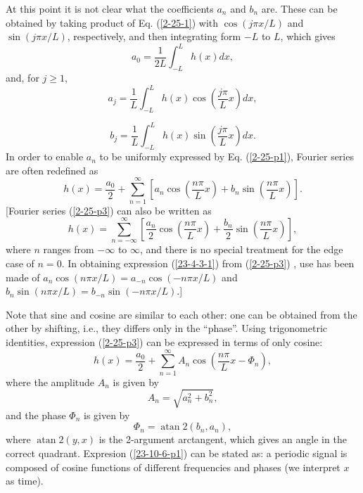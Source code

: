\documentclass{article}
\newcommand{\tmop}[1]{\ensuremath{\operatorname{#1}}}
\begin{document}
At this point it is not clear what the coefficients $a_n$ and $b_n$ are. These
can be obtained by taking product of Eq. (\ref{2-25-1}) with $\cos (j \pi x /
L)$ and $\sin (j \pi x / L)$, respectively, and then integrating form $- L$ to
$L$, which gives
\begin{equation}
  a_0 = \frac{1}{2 L} \int_{- L}^L h (x) d x,
\end{equation}
and, for $j \geqslant 1$,
\begin{equation}
  \label{2-25-p1} a_j = \frac{1}{L} \int_{- L}^L h (x) \cos \left( \frac{j
  \pi}{L} x \right) d x,
\end{equation}

\begin{equation}
  \label{2-25-p1m} b_j = \frac{1}{L} \int_{- L}^L h (x) \sin \left( \frac{j
  \pi}{L} x \right) d x.
\end{equation}
In order to enable $a_n$ to be uniformly expressed by Eq. (\ref{2-25-p1}),
Fourier series are often redefined as
\begin{equation}
  \label{2-25-p3} h (x) = \frac{a_0}{2} + \sum_{n = 1}^{\infty} \left[ a_n
  \cos \left( \frac{n \pi}{L} x \right) + b_n \sin \left( \frac{n \pi}{L} x
  \right) \right] .
\end{equation}
[Fourier series (\ref{2-25-p3}) can also be written as
\begin{equation}
  \label{23-4-3-1} h (x) = \sum_{n = - \infty}^{\infty} \left[ \frac{a_n}{2}
  \cos \left( \frac{n \pi}{L} x \right) + \frac{b_n}{2} \sin \left( \frac{n
  \pi}{L} x \right) \right],
\end{equation}
where $n$ ranges from $- \infty$ to $\infty$, and there is no special
treatment for the edge case of $n = 0$. In obtaining expression
(\ref{23-4-3-1}) from (\ref{2-25-p3}) , use has been made of $a_n \cos (n \pi
x / L) = a_{- n} \cos (- n \pi x / L)$ and $b_n \sin (n \pi x / L) = b_{- n}
\sin (- n \pi x / L)$.]

Note that sine and cosine are similar to each other: one can be obtained from
the other by shifting, i.e., they differs only in the ``phase''. Using
trigonometric identities, expression (\ref{2-25-p3}) can be expressed in terms
of only cosine:
\begin{equation}
  \label{23-10-6-p1} h (x) = \frac{a_0}{2} + \sum_{n = 1}^{\infty} A_n \cos
  \left( \frac{n \pi}{L} x - \Phi_n \right),
\end{equation}
where the amplitude $A_n$ is given by
\begin{equation}
  \label{20-12-16-a1} A_n = \sqrt{a_n^2 + b_n^2},
\end{equation}
and the phase $\Phi_n$ is given by
\begin{equation}
  \label{20-12-19-a1} \Phi_n = \tmop{atan} 2 (b_n, a_n),
\end{equation}
where $\tmop{atan} 2 (y, x)$ is the 2-argument arctangent, which gives an
angle in the correct quadrant. Expresion (\ref{23-10-6-p1}) can be stated as:
a periodic signal is composed of cosine functions of different frequencies and
phases (we interpret $x$ as time).
\end{document}
